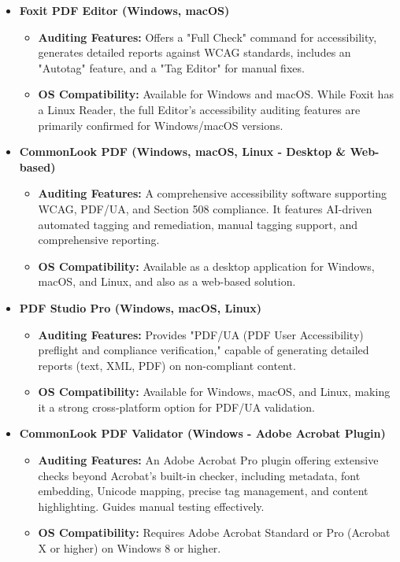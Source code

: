 \begin{itemize}

\item \textbf{Foxit PDF Editor (Windows, macOS)} \cite{FoxitManual}
    \begin{itemize}
    \item \textbf{Auditing Features:} Offers a "Full Check" command for accessibility, generates detailed reports against WCAG standards, includes an "Autotag" feature, and a "Tag Editor" for manual fixes.
    \item \textbf{OS Compatibility:} Available for Windows and macOS. While Foxit has a Linux Reader, the full Editor's accessibility auditing features are primarily confirmed for Windows/macOS versions.
    \end{itemize}

\item \textbf{CommonLook PDF (Windows, macOS, Linux - Desktop \& Web-based)} \cite{AllyantCommonLook}
    \begin{itemize}
    \item \textbf{Auditing Features:} A comprehensive accessibility software supporting WCAG, PDF/UA, and Section 508 compliance. It features AI-driven automated tagging and remediation, manual tagging support, and comprehensive reporting.
    \item \textbf{OS Compatibility:} Available as a desktop application for Windows, macOS, and Linux, and also as a web-based solution.
    \end{itemize}

\item \textbf{PDF Studio Pro (Windows, macOS, Linux)} \cite{QoppaPDFStudio}
    \begin{itemize}
    \item \textbf{Auditing Features:} Provides "PDF/UA (PDF User Accessibility) preflight and compliance verification," capable of generating detailed reports (text, XML, PDF) on non-compliant content.
    \item \textbf{OS Compatibility:} Available for Windows, macOS, and Linux, making it a strong cross-platform option for PDF/UA validation.
    \end{itemize}

\item \textbf{CommonLook PDF Validator (Windows - Adobe Acrobat Plugin)} \cite{AllyantValidator}
    \begin{itemize}
    \item \textbf{Auditing Features:} An Adobe Acrobat Pro plugin offering extensive checks beyond Acrobat's built-in checker, including metadata, font embedding, Unicode mapping, precise tag management, and content highlighting. Guides manual testing effectively.
    \item \textbf{OS Compatibility:} Requires Adobe Acrobat Standard or Pro (Acrobat X or higher) on Windows 8 or higher.
    \end{itemize}


\end{itemize}
